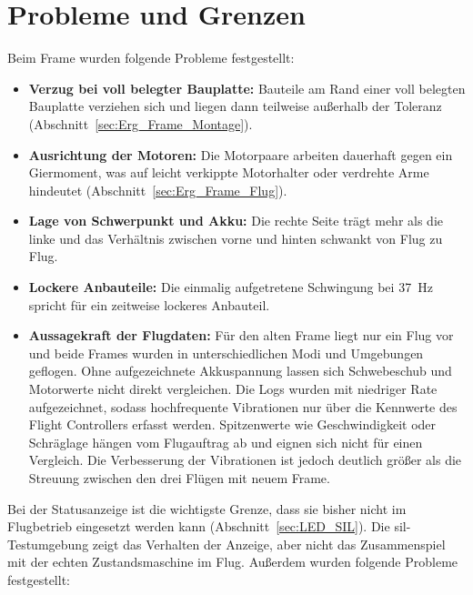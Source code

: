     \section{Probleme und Grenzen}
    \label{sec:Diskussion_Grenzen}

    Beim Frame wurden folgende Probleme festgestellt:

    \begin{itemize}
        \item \textbf{Verzug bei voll belegter Bauplatte:} Bauteile am Rand einer voll belegten Bauplatte verziehen sich und liegen dann teilweise außerhalb der Toleranz (Abschnitt~\ref{sec:Erg_Frame_Montage}).
        \item \textbf{Ausrichtung der Motoren:} Die Motorpaare arbeiten dauerhaft gegen ein Giermoment, was auf leicht verkippte Motorhalter oder verdrehte Arme hindeutet (Abschnitt~\ref{sec:Erg_Frame_Flug}).
        \item \textbf{Lage von Schwerpunkt und Akku:} Die rechte Seite trägt mehr als die linke und das Verhältnis zwischen vorne und hinten schwankt von Flug zu Flug.
        \item \textbf{Lockere Anbauteile:} Die einmalig aufgetretene Schwingung bei \SI{37}{\hertz} spricht für ein zeitweise lockeres Anbauteil.
        \item \textbf{Aussagekraft der Flugdaten:} Für den alten Frame liegt nur ein Flug vor und beide Frames wurden in unterschiedlichen Modi und Umgebungen geflogen. Ohne aufgezeichnete Akkuspannung lassen sich Schwebeschub und Motorwerte nicht direkt vergleichen. Die Logs wurden mit niedriger Rate aufgezeichnet, sodass hochfrequente Vibrationen nur über die Kennwerte des Flight Controllers erfasst werden. Spitzenwerte wie Geschwindigkeit oder Schräglage hängen vom Flugauftrag ab und eignen sich nicht für einen Vergleich. Die Verbesserung der Vibrationen ist jedoch deutlich größer als die Streuung zwischen den drei Flügen mit neuem Frame.
    \end{itemize}

    Bei der Statusanzeige ist die wichtigste Grenze, dass sie bisher nicht im Flugbetrieb eingesetzt werden kann (Abschnitt~\ref{sec:LED_SIL}). Die \gls{sil}-Testumgebung zeigt das Verhalten der Anzeige, aber nicht das Zusammenspiel mit der echten Zustandsmaschine im Flug. Außerdem wurden folgende Probleme festgestellt:

